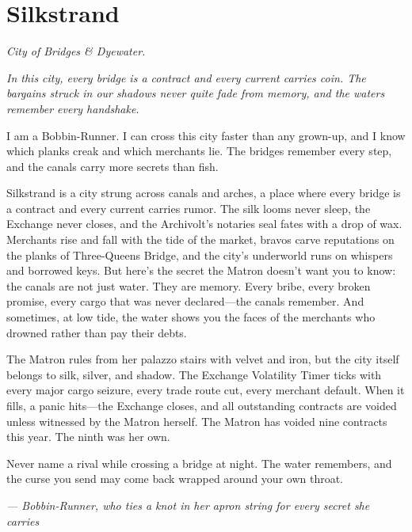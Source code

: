 \newpage

\newpage

\chapter{Silkstrand}
\emph{City of Bridges \& Dyewater.}

\noindent
{\Large
\textit{In this city, every bridge is a contract and every current carries coin. The bargains struck in our shadows never quite fade from memory, and the waters remember every handshake.}

\vspace{0.5em}

I am a Bobbin-Runner. I can cross this city faster than any grown-up, and I know which planks creak and which merchants lie. The bridges remember every step, and the canals carry more secrets than fish.

\vspace{0.5em}

Silkstrand is a city strung across canals and arches, a place where every bridge is a contract and every current carries rumor. The silk looms never sleep, the Exchange never closes, and the Archivolt's notaries seal fates with a drop of wax. Merchants rise and fall with the tide of the market, bravos carve reputations on the planks of Three-Queens Bridge, and the city's underworld runs on whispers and borrowed keys. But here's the secret the Matron doesn't want you to know: the canals are not just water. They are memory. Every bribe, every broken promise, every cargo that was never declared---the canals remember. And sometimes, at low tide, the water shows you the faces of the merchants who drowned rather than pay their debts.

\vspace{0.5em}

The Matron rules from her palazzo stairs with velvet and iron, but the city itself belongs to silk, silver, and shadow. The Exchange Volatility Timer ticks with every major cargo seizure, every trade route cut, every merchant default. When it fills, a panic hits---the Exchange closes, and all outstanding contracts are voided unless witnessed by the Matron herself. The Matron has voided nine contracts this year. The ninth was her own.

\vspace{0.5em}

Never name a rival while crossing a bridge at night. The water remembers, and the curse you send may come back wrapped around your own throat.

\vspace{1em}

\noindent\textit{--- Bobbin-Runner, who ties a knot in her apron string for every secret she carries}
}


